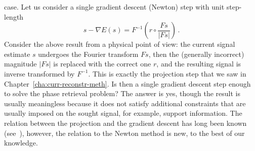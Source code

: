 case.  Let us consider a single gradient descent (Newton) step with
unit step-length
\begin{equation}
  \label{eq:84}
  s - \nabla E(s) = F^{-1}
  \left(
    r\circ \frac{Fs}{|Fs|}
  \right) \,. 
\end{equation}
Consider the above result from a physical point of view: the current
signal estimate $s$ undergoes the Fourier transform $Fs$, then the
(generally incorrect) magnitude $|Fs|$ is replaced with the correct one $r$,
and the resulting signal is inverse transformed by $F^{-1}$. This is
exactly the projection step that we saw in
Chapter~\ref{cha:curr-reconstr-meth}. Is then  a single gradient descent
step enough to solve the phase retrieval problem? The answer is yes,
though the result is usually meaningless because it does not satisfy
additional constraints that are usually imposed on the sought signal,
for example, support information. The relation between the projection
and the gradient descent has long been known
(see~\cite{fienup82phase}), however, the relation to the Newton method
is new, to the best of our knowledge.

